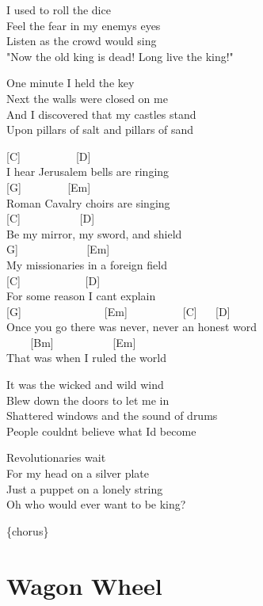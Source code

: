 \documentclass[
  letterpaper,
  twoside=false]{scrbook}
\begin{document}
I used to roll the dice\\
Feel the fear in my enemy\textquotesingle s eyes\\
Listen as the crowd would sing\\
"Now the old king is dead! Long live the king!"

One minute I held the key\\
Next the walls were closed on me\\
And I discovered that my castles stand\\
Upon pillars of salt and pillars of sand

{[}C{]} ~ ~ ~ ~ ~ ~{[}D{]}\\
I hear Jerusalem bells are ringing\\
{[}G{]} ~ ~ ~ ~ ~{[}Em{]}\\
Roman Cavalry choirs are singing\\
{[}C{]} ~ ~ ~ ~ ~ ~ {[}D{]}\\
Be my mirror, my sword, and shield\\
\hspace*{0.333em}{[}G{]} ~ ~ ~ ~ ~ ~ ~ {[}Em{]}\\
My missionaries in a foreign field\\
{[}C{]} ~ ~ ~ ~ ~ ~ ~{[}D{]}\\
For some reason I can\textquotesingle t explain\\
{[}G{]} ~ ~ ~ ~ ~ ~ ~ ~ ~{[}Em{]} ~ ~ ~ ~ ~ ~{[}C{]} ~ ~{[}D{]}\\
Once you go there was never, never an honest word\\
\hspace*{0.333em} ~ ~ ~{[}Bm{]} ~ ~ ~ ~ ~ ~ {[}Em{]}\\
That was when I ruled the world

It was the wicked and wild wind\\
Blew down the doors to let me in\\
Shattered windows and the sound of drums\\
People couldn\textquotesingle t believe what I\textquotesingle d become

Revolutionaries wait\\
For my head on a silver plate\\
Just a puppet on a lonely string\\
Oh who would ever want to be king?

\{chorus\}

\hypertarget{wagon-wheel}{%
\chapter{Wagon Wheel}\label{wagon-wheel}}
\end{document}
